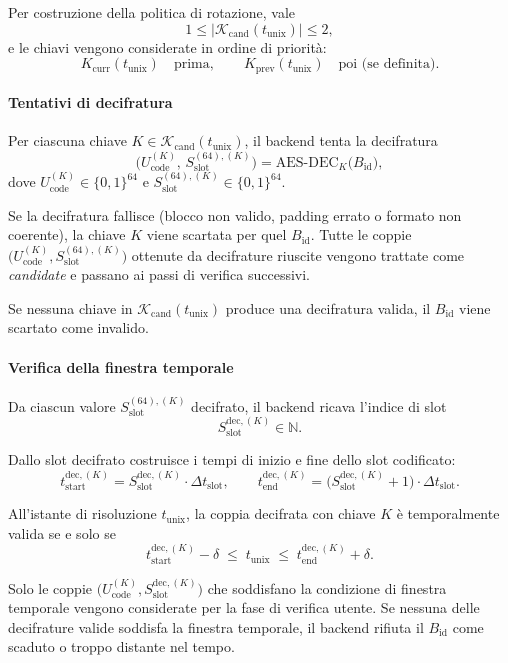 \documentclass[a4paper,11pt]{article}
\begin{document}
Per costruzione della politica di rotazione, vale
\[
  1 \le \bigl|\mathcal{K}_{\mathrm{cand}}(t_{\text{unix}})\bigr| \le 2,
\]
e le chiavi vengono considerate in ordine di priorità:
\[
  K_{\text{curr}}(t_{\text{unix}}) \quad\text{prima}, \qquad
  K_{\text{prev}}(t_{\text{unix}}) \quad\text{poi (se definita)}.
\]

\paragraph{Tentativi di decifratura}
Per ciascuna chiave \(K \in \mathcal{K}_{\mathrm{cand}}(t_{\text{unix}})\), il backend tenta la decifratura
\[
  \bigl(U_{\text{code}}^{(K)},\, S_{\text{slot}}^{(64),(K)}\bigr)
  = \mathrm{AES\text{-}DEC}_{K}\bigl(B_{\text{id}}\bigr),
\]
dove \(U_{\text{code}}^{(K)} \in \{0,1\}^{64}\) e \(S_{\text{slot}}^{(64),(K)} \in \{0,1\}^{64}\).

Se la decifratura fallisce (blocco non valido, padding errato o formato non coerente), la chiave \(K\) viene scartata per quel \(B_{\text{id}}\).
Tutte le coppie \(\bigl(U_{\text{code}}^{(K)}, S_{\text{slot}}^{(64),(K)}\bigr)\) ottenute da decifrature riuscite vengono trattate come
\emph{candidate} e passano ai passi di verifica successivi.

Se nessuna chiave in \(\mathcal{K}_{\mathrm{cand}}(t_{\text{unix}})\) produce una decifratura valida, il \(B_{\text{id}}\) viene scartato come invalido.

\paragraph{Verifica della finestra temporale}
Da ciascun valore \(S_{\text{slot}}^{(64),(K)}\) decifrato, il backend ricava l'indice di slot
\[
  S_{\text{slot}}^{\text{dec},(K)} \in \mathbb{N}.
\]

Dallo slot decifrato costruisce i tempi di inizio e fine dello slot codificato:
\[
  t_{\text{start}}^{\text{dec},(K)}
  = S_{\text{slot}}^{\text{dec},(K)} \cdot \Delta t_{\text{slot}}, \qquad
  t_{\text{end}}^{\text{dec},(K)}
  = \bigl(S_{\text{slot}}^{\text{dec},(K)} + 1\bigr) \cdot \Delta t_{\text{slot}}.
\]

All'istante di risoluzione \(t_{\text{unix}}\), la coppia decifrata con chiave \(K\) è
temporalmente valida se e solo se
\[
  t_{\text{start}}^{\text{dec},(K)} - \delta
  \;\le\;
  t_{\text{unix}}
  \;\le\;
  t_{\text{end}}^{\text{dec},(K)} + \delta.
\]

Solo le coppie \(\bigl(U_{\text{code}}^{(K)}, S_{\text{slot}}^{\text{dec},(K)}\bigr)\) che soddisfano
la condizione di finestra temporale vengono considerate per la fase di verifica utente. Se nessuna
delle decifrature valide soddisfa la finestra temporale, il backend rifiuta il
\(B_{\text{id}}\) come scaduto o troppo distante nel tempo.
\end{document}
